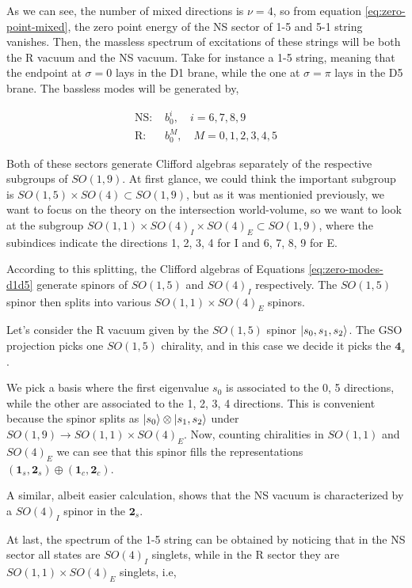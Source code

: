 As we can see, the number of mixed directions is $\nu = 4$, so from equation \ref{eq:zero-point-mixed}, the zero point energy of the NS sector of 1-5 and 5-1 string vanishes. Then, the massless spectrum of excitations of these strings will be both the R vacuum and the NS vacuum. Take for instance a 1-5 string, meaning that the endpoint at $\sigma = 0$ lays in the D1 brane, while the one at $\sigma = \pi$ lays in the D5 brane. The bassless modes will be generated by,

\begin{align}
    \label{eq:zero-modes-d1d5}
    \text{NS: } &b_0^i, \quad i=6,7,8,9\\
    \text{R: }  &b_0^M, \quad M = 0,1,2,3,4,5
\end{align}

Both of these sectors generate Clifford algebras separately of the respective subgroups of $SO(1,9)$. At first glance, we could think the important subgroup is $SO(1,5) \times SO(4) \subset SO(1,9) $, but as it was mentionied previously, we want to focus on the theory on the intersection world-volume, so we want to look at the subgroup $SO(1,1) \times SO(4)_I \times SO(4)_E \subset SO(1,9)$, where the subindices indicate the directions 1, 2, 3, 4 for I and 6, 7, 8, 9 for E.

According to this splitting, the Clifford algebras of Equations \ref{eq:zero-modes-d1d5} generate spinors of $SO(1,5)$ and $SO(4)_I$ respectively. The $SO(1,5)$ spinor then splits into various $SO(1,1) \times SO(4)_E$ spinors.

Let's consider the R vacuum given by the $SO(1,5)$ spinor $\lvert s_0, s_1, s_2\rangle$. The GSO projection picks one $SO(1,5)$ chirality, and in this case we decide it picks the $\mathbf{4}_s$.

We pick a basis where the first eigenvalue $s_0$ is associated to the 0, 5 directions, while the other are associated to the 1, 2, 3, 4 directions. This is convenient because the spinor splits as $\lvert s_0\rangle \otimes \lvert s_1, s_2\rangle$ under $SO(1,9) \rightarrow SO(1,1) \times SO(4)_E$. Now, counting chiralities in $SO(1,1)$ and $SO(4)_E$ we can see that this spinor fills the representations $(\mathbf{1}_s, \mathbf{2}_s) \oplus (\mathbf{1}_c, \mathbf{2}_c)$.

A similar, albeit easier calculation, shows that the NS vacuum is characterized by a $SO(4)_I$ spinor in the $\mathbf{2}_s$.

At last, the spectrum of the 1-5 string can be obtained by noticing that in the NS sector all states are $SO(4)_I$ singlets, while in the R sector they are $SO(1,1) \times SO(4)_E$ singlets, i.e,


